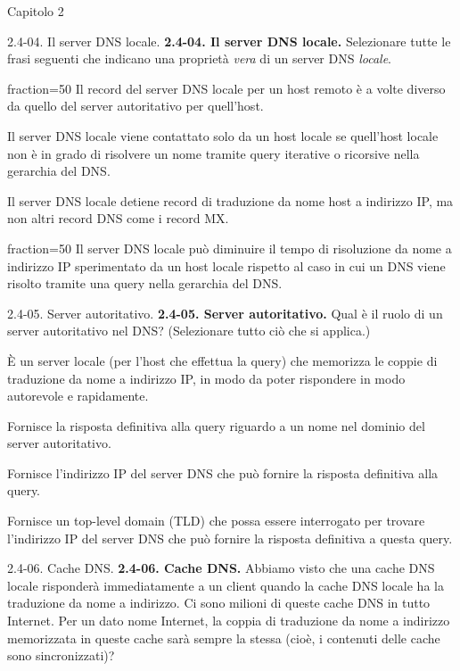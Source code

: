 \documentclass[11pt]{article}
\begin{document}
\begin{quiz}{Capitolo 2}
\begin{multi}[points=1,shuffle,multiple]{2.4-04. Il server DNS locale.}
\textbf{2.4-04. Il server DNS locale.} 
Selezionare tutte le frasi seguenti che indicano una proprietà \emph{vera} di un server DNS \emph{locale}.
\item[fraction=50] Il record del server DNS locale per un host remoto è a volte diverso da quello del server autoritativo per quell'host.
\item Il server DNS locale viene contattato solo da un host locale se quell'host locale non è in grado di risolvere un nome tramite query iterative o ricorsive nella gerarchia del DNS.
\item Il server DNS locale detiene record di traduzione da nome host a indirizzo IP, ma non altri record DNS come i record MX.
\item[fraction=50] Il server DNS locale può diminuire il tempo di risoluzione da nome a indirizzo IP sperimentato da un host locale rispetto al caso in cui un DNS viene risolto tramite una query nella gerarchia del DNS.
\end{multi}


\begin{multi}[points=1,shuffle,multiple]{2.4-05. Server autoritativo.}
\textbf{2.4-05. Server autoritativo.} 
Qual è il ruolo di un server autoritativo nel DNS? (Selezionare tutto ciò che si applica.)
\item È un server locale (per l'host che effettua la query) che memorizza le coppie di traduzione da nome a indirizzo IP, in modo da poter rispondere in modo autorevole e rapidamente.
\item* Fornisce la risposta definitiva alla query riguardo a un nome nel dominio del server autoritativo.
\item Fornisce l'indirizzo IP del server DNS che può fornire la risposta definitiva alla query.
\item Fornisce un top-level domain (TLD) che possa essere interrogato per trovare l'indirizzo IP del server DNS che può fornire la risposta definitiva a questa query.
\end{multi}

\begin{multi}[points=1,shuffle]{2.4-06. Cache DNS.}
\textbf{2.4-06. Cache DNS.}
Abbiamo visto che una cache DNS locale risponderà immediatamente a un client quando la cache DNS locale ha la traduzione da nome a indirizzo. Ci sono milioni di queste cache DNS in tutto Internet. Per un dato nome Internet, la coppia di traduzione da nome a indirizzo memorizzata in queste cache sarà sempre la stessa (cioè, i contenuti delle cache sono sincronizzati)?


\end{multi}
\end{quiz}
\end{document}
